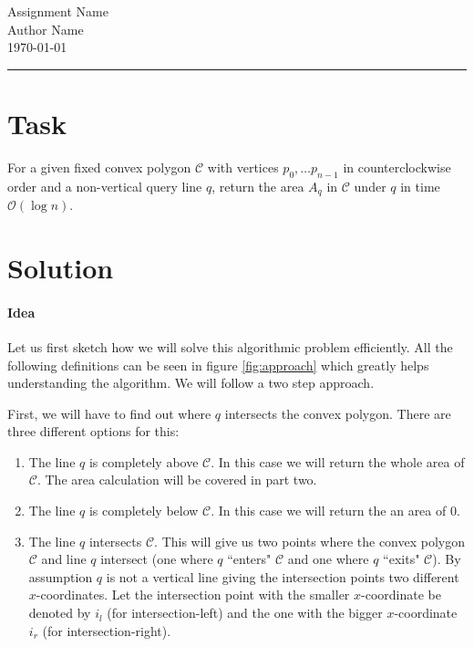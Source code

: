\documentclass[12pt]{article}
\theoremstyle{definition}
\theoremstyle{remark}
\renewcommand{\O}[1]{\mathcal{O}\left(#1\right)}
\newcommand{\C}{\mathcal{C}}
\begin{document}
	\thispagestyle{fancy}
\begin{center}
	{\Huge Assignment Name}  \\ Author Name\\
\today
\end{center}

\hrule

\vspace*{5mm}

\section{Task}
For a given fixed convex polygon $\C$ with vertices $p_0,\ldots p_{n-1}$ in counterclockwise order and a non-vertical query line $q$, return the area $A_q$ in $\C$ under $q$ in time $\O{\log n}$.


\section{Solution}

\paragraph{Idea}

Let us first sketch how we will solve this algorithmic problem efficiently. All the following definitions can be seen in figure \ref{fig:approach} which greatly helps understanding the algorithm.
We will follow a two step approach.

First, we will have to find out where $q$ intersects the convex polygon. There are three different options for this:
\begin{enumerate}
\item The line $q$ is completely above $\C$. In this case we will return the whole area of $\C$. The area calculation will be covered in part two.
\item The line $q$ is completely below $\C$. In this case we will return the an area of 0.
\item The line $q$ intersects $\C$. This will give us two points where the convex polygon $\C$ and line $q$ intersect (one where $q$ ``enters" $\C$ and one where $q$ ``exits" $\C$). By assumption $q$ is not a vertical line giving the intersection points two different $x$-coordinates. Let the intersection point with the smaller $x$-coordinate be denoted by $i_l$ (for intersection-left) and the one with the bigger $x$-coordinate $i_r$ (for intersection-right).
\end{enumerate}
\end{document}
